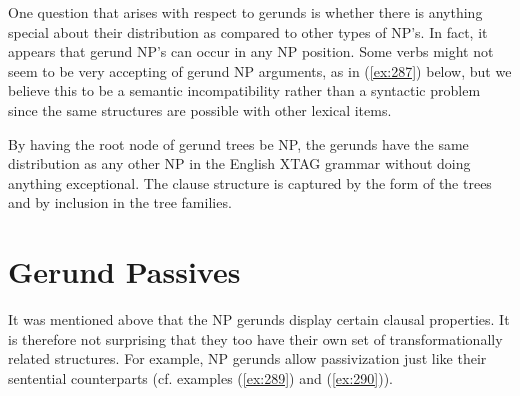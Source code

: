  
\beginsentences
{}\label{ex:284} 
\label{ex:285} 
\label{ex:286} 
\endsentences

 
One question that arises with respect to gerunds is whether there is anything 
special about their distribution as compared to other types of NP's.  In fact, 
it appears that gerund NP's can occur in any NP position.  Some verbs might not 
seem to be very accepting of gerund NP arguments, as in (\ref{ex:287}) below, but we 
believe this to be a semantic incompatibility rather than a syntactic problem 
since the same structures are possible with other lexical items. 
 
\beginsentences
{}\label{ex:287} 
\label{ex:288} 
\endsentences

 
By having the root node of gerund trees be NP, the gerunds have the same 
distribution as any other NP in the English XTAG grammar without doing 
anything exceptional. The clause structure is captured by the form of the trees 
and by inclusion in the tree families. 
 
\section{Gerund Passives} 
 
It was mentioned above that the NP gerunds display certain clausal 
properties. It is therefore not surprising that they too have their own set 
of transformationally related structures. For example, NP gerunds allow 
passivization just like their sentential counterparts (cf. examples 
(\ref{ex:289}) and (\ref{ex:290})). 
 
\beginsentences
{}\label{ex:289} 
\label{ex:290} 
\endsentences

